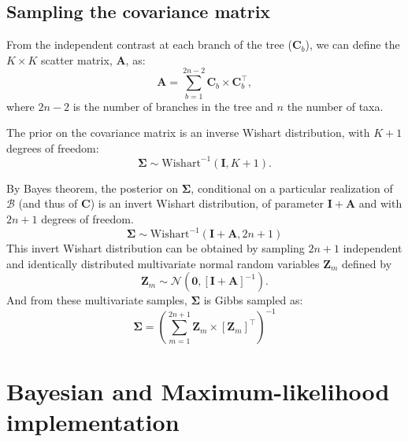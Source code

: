 \documentclass{article}
\newcommand{\MultiplyMatrix}{\times}
\newcommand{\UniDimArray}[1]{\bm{#1}}
\newcommand{\BiDimArray}[1]{\bm{#1}}
\newcommand{\tr}{^{\intercal}}
\newcommand{\inv}{^{-1}}
\newcommand{\Branch}{b}
\newcommand{\WishartIDD}{m}
\newcommand{\NbrTaxa}{n}
\newcommand{\VecZero}{\UniDimArray{0}}
\newcommand{\Nbranch}{2 \NbrTaxa - 2}
\newcommand{\WishartPostDf}{2 \NbrTaxa + 1}
\newcommand{\Ntrait}{K}
\newcommand{\contrast}{\UniDimArray{C}}
\newcommand{\Covariancematrix}{\Sigma}
\newcommand{\CovarianceMatrix}{\BiDimArray{\Covariancematrix}}
\newcommand{\Identitymatrix}{\BiDimArray{I}}
\newcommand{\brownian}{\mathcal{B}}
\newcommand{\Brownian}{\UniDimArray{\brownian}}
\newcommand{\Scattermatrix}{\BiDimArray{A}}
\newcommand{\Multivariate}{\UniDimArray{Z}}
\begin{document}
\subsection{Sampling the covariance matrix}\label{subsec:sampling-the-covariance-matrix}
From the independent contrast at each branch of the tree ($\contrast_{\Branch}$), we can define the $\Ntrait \times \Ntrait$ scatter matrix, $\Scattermatrix$, as:
\begin{equation}
    \Scattermatrix = \sum\limits_{\Branch=1}^{\Nbranch} \contrast_{\Branch} \MultiplyMatrix \contrast_{\Branch}\tr\label{eq:bayes-scatter},
\end{equation}
where $\Nbranch$ is the number of branches in the tree and $\NbrTaxa$ the number of taxa.

The {prior} on the covariance matrix is an inverse Wishart distribution, with $\Ntrait + 1$ degrees of freedom:
\begin{equation}
    \label{eq:Distribcovariance}
    \CovarianceMatrix \sim \text{Wishart}^{-1} (\Identitymatrix, \Ntrait + 1).
\end{equation}

By Bayes theorem, the {posterior} on $\CovarianceMatrix$, conditional on a particular realization of $\Brownian$ (and thus of $\contrast$) is an invert Wishart distribution, of parameter $\Identitymatrix + \Scattermatrix$ and with $\WishartPostDf$ degrees of freedom.
\begin{equation}
    \CovarianceMatrix \sim \text{Wishart}^{-1}\left( \Identitymatrix + \Scattermatrix, \WishartPostDf\right)\label{eq:bayes-posterior}
\end{equation}
This invert Wishart distribution can be obtained by sampling $\WishartPostDf$ independent and identically distributed multivariate normal random variables $\Multivariate_{\WishartIDD}$ defined by
\begin{equation}
    \Multivariate_{\WishartIDD} \sim \mathcal{N} \left( \VecZero, \left[ \Identitymatrix + \Scattermatrix\right]^{-1} \right).\label{eq:bayes-multivariate}
\end{equation}
And from these multivariate samples, $\CovarianceMatrix$ is Gibbs sampled as:
\begin{equation}
    \CovarianceMatrix = \left( \sum\limits_{\WishartIDD=1}^{\WishartPostDf} \Multivariate_{\WishartIDD} \MultiplyMatrix  \left[\Multivariate_{\WishartIDD} \right] \tr \right)\inv \label{eq:bayes-gibbs}
\end{equation}

\newpage
\section{Bayesian and Maximum-likelihood implementation}\label{sec:implementation}
\end{document}

